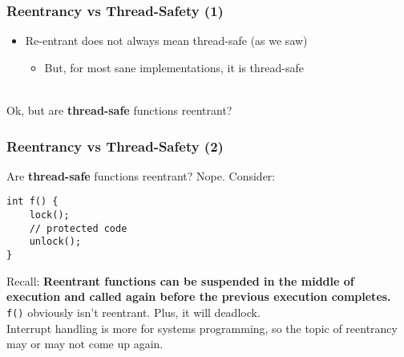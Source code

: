 \begin{frame}
  \frametitle{Reentrancy vs Thread-Safety (1)}

  
  \begin{itemize}
    \item Re-entrant does not always mean thread-safe (as we saw)
      \begin{itemize}
        \item But, for most sane implementations, it is thread-safe
      \end{itemize}
  \end{itemize}~\\[1em]

  Ok, but are {\bf thread-safe} functions reentrant?
  
\end{frame}

\begin{frame}[fragile]
  \frametitle{Reentrancy vs Thread-Safety (2)}

  
  Are {\bf thread-safe} functions reentrant? \alert{Nope.} Consider:

  \begin{lstlisting}
int f() {
    lock();
    // protected code
    unlock();
}
  \end{lstlisting}

  Recall: {\bf Reentrant functions can be suspended in the middle of execution
    and called again before the previous execution completes.}\\[1em]

  {\tt f()} obviously isn't reentrant. Plus, it will deadlock.\\[1em]

  Interrupt handling is more for systems programming, so the topic of reentrancy may or may not come
  up again.
  
\end{frame}

